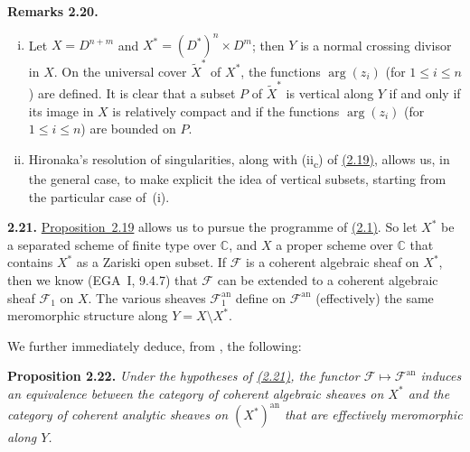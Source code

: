 \documentclass{report}
\newenvironment{itenv}[1]
  {\phantomsection\par\medskip\noindent\textbf{#1.}\itshape}
  {\medskip}
\newenvironment{rmenv}[1]
  {\phantomsection\par\medskip\noindent\textbf{#1.}\rmfamily}
  {\medskip}
\newcommand{\scr}[1]{{\mathscr{#1}}}
\newcommand{\CC}{\mathbb{C}}
\newcommand{\an}{\mathrm{an}}
\renewcommand{\leq}{\leqslant}
\begin{document}
\begin{rmenv}{Remarks 2.20}
  \begin{enumerate}[(i)]
    \item Let $X=D^{n+m}$ and $X^*=(D^*)^n\times D^m$;
      then $Y$ is a normal crossing divisor in $X$.
      On the universal cover $\widetilde{X}^*$ of $X^*$, the functions $\arg(z_i)$ (for $1\leq i\leq n$) are defined.
      It is clear that a subset $P$ of $\widetilde{X}^*$ is vertical along $Y$ if and only if its image in $X$ is relatively compact and if the functions $\arg(z_i)$ (for $1\leq i\leq n$) are bounded on $P$.
    \item Hironaka's resolution of singularities, along with (ii\textsubscript{c}) of \hyperref[II.2.19]{(2.19)}, allows us, in the general case, to make explicit the idea of vertical subsets, starting from the particular case of~(i).
  \end{enumerate}
\end{rmenv}

\begin{rmenv}{2.21}
\label{II.2.21}
  \hyperref[II.2.19]{Proposition~2.19} allows us to pursue the programme of \hyperref[II.2.1]{(2.1)}.
  So let $X^*$ be a separated scheme of finite type over $\CC$, and $X$ a proper scheme over $\CC$ that contains $X^*$ as a Zariski open subset.
  If $\scr{F}$ is a coherent algebraic sheaf on $X^*$, then we know (EGA~I, 9.4.7) that $\scr{F}$ can be extended to a coherent algebraic sheaf $\scr{F}_1$ on $X$.
  The various sheaves $\scr{F}_1^\an$ define on $\scr{F}^\an$ (effectively) the same meromorphic structure along $Y=X\setminus X^*$.
\end{rmenv}

We further immediately deduce, from \cite{GAGA}, the following:

\begin{itenv}{Proposition 2.22}
\label{II.2.22}
  Under the hypotheses of \hyperref[II.2.21]{(2.21)}, the functor $\scr{F}\mapsto\scr{F}^\an$ induces an equivalence between the category of coherent algebraic sheaves on $X^*$ and the category of coherent analytic sheaves on $(X^*)^\an$ that are effectively meromorphic along $Y$.
\end{itenv}
\end{document}

